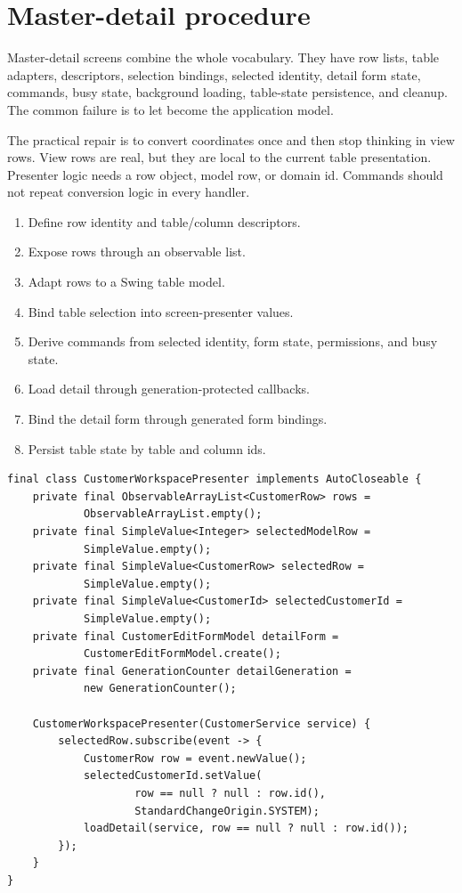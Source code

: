 \section{Master-detail procedure}

Master-detail screens combine the whole vocabulary. They have row lists, table adapters, descriptors, selection bindings, selected identity, detail form state, commands, busy state, background loading, table-state persistence, and cleanup. The common failure is to let  become the application model.

The practical repair is to convert coordinates once and then stop thinking in view rows. View rows are real, but they are local to the current table presentation. Presenter logic needs a row object, model row, or domain id. Commands should not repeat conversion logic in every handler.

\begin{enumerate}
\item Define row identity and table/column descriptors.
\item Expose rows through an observable list.
\item Adapt rows to a Swing table model.
\item Bind table selection into screen-presenter values.
\item Derive commands from selected identity, form state, permissions, and busy state.
\item Load detail through generation-protected callbacks.
\item Bind the detail form through generated form bindings.
\item Persist table state by table and column ids.
\end{enumerate}

\begin{lstlisting}[caption={Presenter state separates table mechanics from meaning.}]
final class CustomerWorkspacePresenter implements AutoCloseable {
    private final ObservableArrayList<CustomerRow> rows =
            ObservableArrayList.empty();
    private final SimpleValue<Integer> selectedModelRow =
            SimpleValue.empty();
    private final SimpleValue<CustomerRow> selectedRow =
            SimpleValue.empty();
    private final SimpleValue<CustomerId> selectedCustomerId =
            SimpleValue.empty();
    private final CustomerEditFormModel detailForm =
            CustomerEditFormModel.create();
    private final GenerationCounter detailGeneration =
            new GenerationCounter();

    CustomerWorkspacePresenter(CustomerService service) {
        selectedRow.subscribe(event -> {
            CustomerRow row = event.newValue();
            selectedCustomerId.setValue(
                    row == null ? null : row.id(),
                    StandardChangeOrigin.SYSTEM);
            loadDetail(service, row == null ? null : row.id());
        });
    }
}
\end{lstlisting}

